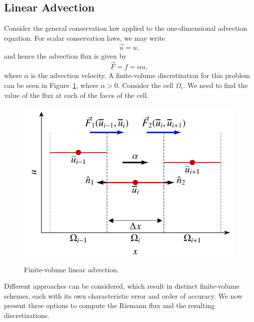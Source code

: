 \subsection{Linear Advection}
Consider the general conservation law applied to the one-dimensional advection equation. For scalar conservation laws, we may write
\begin{equation}
 \vec{u} = u,
\end{equation}
and hence the advection flux is given by
\begin{equation}
 \vec{F} = f = \alpha u,
\end{equation}
where $\alpha$ is the advection velocity. A finite-volume discretization for this problem can be seen in Figure~\ref{fig:fv_advection}, where $\alpha >0$. Consider the cell $\Omega_i$. We need to find the value of the flux at each of the faces of the cell. 
\begin{figure}[htbp]
 \centering
 \includegraphics[width=0.5\linewidth]{Pictures/fv_advection}
 \caption{Finite-volume linear advection.}
 \label{fig:fv_advection}
\end{figure}
Different approaches can be considered, which result in distinct finite-volume schemes, each with its own characteristic error and order of accuracy. We now present three options to compute the Riemann flux and the resulting discretizations.
